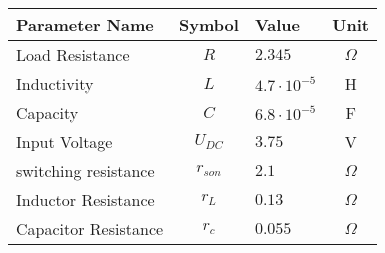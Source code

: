 \begin{tabular}{lclc}
\hline
 Parameter Name       &  Symbol   & Value               &   Unit   \\
\hline
 Load Resistance      &    $R$    & $2.345$             & $\Omega$ \\
 Inductivity          &    $L$    & $4.7 \cdot 10^{-5}$ &    H     \\
 Capacity             &    $C$    & $6.8 \cdot 10^{-5}$ &    F     \\
 Input Voltage        & $U_{DC}$  & $3.75$              &    V     \\
 switching resistance & $r_{son}$ & $2.1$               & $\Omega$ \\
 Inductor Resistance  &  $r_{L}$  & $0.13$              & $\Omega$ \\
 Capacitor Resistance &  $r_{c}$  & $0.055$             & $\Omega$ \\
\hline
\end{tabular}